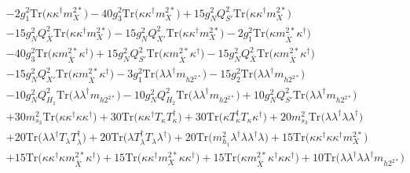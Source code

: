 {\begin{align}
 &-2 g_{1}^{2} \mbox{Tr}\Big({\kappa  \kappa^{\dagger}  m_{X}^{2 *}}\Big) -40 g_{3}^{2} \mbox{Tr}\Big({\kappa  \kappa^{\dagger}  m_{X}^{2 *}}\Big) +15 g_{N}^{2} Q_{S'}^{2} \mbox{Tr}\Big({\kappa  \kappa^{\dagger}  m_{X}^{2 *}}\Big) \nonumber \\ 
 &-15 g_{N}^{2} Q_{\bar{X}}^{2} \mbox{Tr}\Big({\kappa  \kappa^{\dagger}  m_{X}^{2 *}}\Big) -15 g_{N}^{2} Q_{X'}^{2} \mbox{Tr}\Big({\kappa  \kappa^{\dagger}  m_{X}^{2 *}}\Big) -2 g_{1}^{2} \mbox{Tr}\Big({\kappa  m_{\bar{X}}^{2 *}  \kappa^{\dagger}}\Big) \nonumber \\ 
 &-40 g_{3}^{2} \mbox{Tr}\Big({\kappa  m_{\bar{X}}^{2 *}  \kappa^{\dagger}}\Big) +15 g_{N}^{2} Q_{S'}^{2} \mbox{Tr}\Big({\kappa  m_{\bar{X}}^{2 *}  \kappa^{\dagger}}\Big) -15 g_{N}^{2} Q_{\bar{X}}^{2} \mbox{Tr}\Big({\kappa  m_{\bar{X}}^{2 *}  \kappa^{\dagger}}\Big) \nonumber \\ 
 &-15 g_{N}^{2} Q_{X'}^{2} \mbox{Tr}\Big({\kappa  m_{\bar{X}}^{2 *}  \kappa^{\dagger}}\Big) -3 g_{1}^{2} \mbox{Tr}\Big({\lambda  \lambda^{\dagger}  m_{{h 2}^{2 *}}}\Big) -15 g_{2}^{2} \mbox{Tr}\Big({\lambda  \lambda^{\dagger}  m_{{h 2}^{2 *}}}\Big) \nonumber \\ 
 &-10 g_{N}^{2} Q_{H_1}^{2} \mbox{Tr}\Big({\lambda  \lambda^{\dagger}  m_{{h 2}^{2 *}}}\Big) -10 g_{N}^{2} Q_{H_2}^{2} \mbox{Tr}\Big({\lambda  \lambda^{\dagger}  m_{{h 2}^{2 *}}}\Big) +10 g_{N}^{2} Q_{S'}^{2} \mbox{Tr}\Big({\lambda  \lambda^{\dagger}  m_{{h 2}^{2 *}}}\Big) \nonumber \\ 
 &+30 m_{s_3}^2 \mbox{Tr}\Big({\kappa  \kappa^{\dagger}  \kappa  \kappa^{\dagger}}\Big) +30 \mbox{Tr}\Big({\kappa  \kappa^{\dagger}  T_{\kappa}  T_{\kappa}^{\dagger}}\Big) +30 \mbox{Tr}\Big({\kappa  T_{\kappa}^{\dagger}  T_{\kappa}  \kappa^{\dagger}}\Big) +20 m_{s_3}^2 \mbox{Tr}\Big({\lambda  \lambda^{\dagger}  \lambda  \lambda^{\dagger}}\Big) \nonumber \\ 
 &+20 \mbox{Tr}\Big({\lambda  \lambda^{\dagger}  T_{\lambda}  T_{\lambda}^{\dagger}}\Big) +20 \mbox{Tr}\Big({\lambda  T_{\lambda}^{\dagger}  T_{\lambda}  \lambda^{\dagger}}\Big) +20 \mbox{Tr}\Big({m_{h_1}^2  \lambda^{\dagger}  \lambda  \lambda^{\dagger}  \lambda}\Big) +15 \mbox{Tr}\Big({\kappa  \kappa^{\dagger}  \kappa  \kappa^{\dagger}  m_{X}^{2 *}}\Big) \nonumber \\ 
 &+15 \mbox{Tr}\Big({\kappa  \kappa^{\dagger}  \kappa  m_{\bar{X}}^{2 *}  \kappa^{\dagger}}\Big) +15 \mbox{Tr}\Big({\kappa  \kappa^{\dagger}  m_{X}^{2 *}  \kappa  \kappa^{\dagger}}\Big) +15 \mbox{Tr}\Big({\kappa  m_{\bar{X}}^{2 *}  \kappa^{\dagger}  \kappa  \kappa^{\dagger}}\Big) +10 \mbox{Tr}\Big({\lambda  \lambda^{\dagger}  \lambda  \lambda^{\dagger}  m_{{h 2}^{2 *}}}\Big) \nonumber \\ 

\end{align}}
